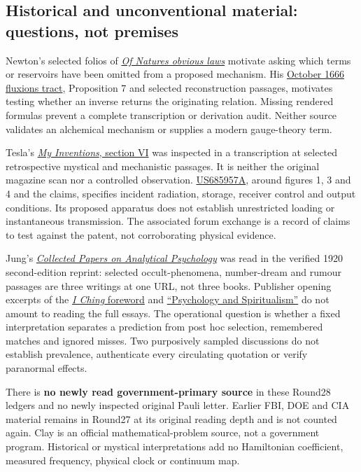 \subsection{Historical and unconventional material: questions, not premises}
Newton's selected folios of \href{https://newton.dlib.indiana.edu/text/ALCH00081/normalized}{\emph{Of Natures obvious laws}} motivate asking which terms or reservoirs have been omitted from a proposed mechanism. His \href{https://www.newtonproject.ox.ac.uk/view/texts/normalized/NATP00100}{October 1666 fluxions tract}, Proposition 7 and selected reconstruction passages, motivates testing whether an inverse returns the originating relation. Missing rendered formulas prevent a complete transcription or derivation audit. Neither source validates an alchemical mechanism or supplies a modern gauge-theory term.

Tesla's \href{https://en.wikisource.org/wiki/My_Inventions}{\emph{My Inventions}, section VI} was inspected in a transcription at selected retrospective mystical and mechanistic passages. It is neither the original magazine scan nor a controlled observation. \href{https://patents.google.com/patent/US685957A/en}{US685957A}, around figures 1, 3 and 4 and the claims, specifies incident radiation, storage, receiver control and output conditions. Its proposed apparatus does not establish unrestricted loading or instantaneous transmission. The associated forum exchange is a record of claims to test against the patent, not corroborating physical evidence.

Jung's \href{https://www.gutenberg.org/files/48225/48225-h/48225-h.htm}{\emph{Collected Papers on Analytical Psychology}} was read in the verified 1920 second-edition reprint: selected occult-phenomena, number-dream and rumour passages are three writings at one URL, not three books. Publisher opening excerpts of the \href{https://www.jstor.org/stable/jj.34571099.5}{\emph{I Ching} foreword} and \href{https://www.jstor.org/stable/j.ctv10crg6v}{``Psychology and Spiritualism''} do not amount to reading the full essays. The operational question is whether a fixed interpretation separates a prediction from post hoc selection, remembered matches and ignored misses. Two purposively sampled discussions do not establish prevalence, authenticate every circulating quotation or verify paranormal effects.

There is \textbf{no newly read government-primary source} in these Round28 ledgers and no newly inspected original Pauli letter. Earlier FBI, DOE and CIA material remains in Round27 at its original reading depth and is not counted again. Clay is an official mathematical-problem source, not a government program. Historical or mystical interpretations add no Hamiltonian coefficient, measured frequency, physical clock or continuum map.

